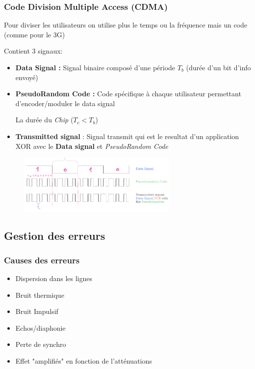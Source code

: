\documentclass[12pt]{article}
\begin{document}
		\subsubsection{Code Division Multiple Access (CDMA)}
		
			Pour diviser les utilisateurs  on utilise plus le temps ou la fréquence mais un code (comme pour le 3G)
			
			Contient 3 signaux:
			\begin{itemize}
				\item \textbf{Data Signal :} Signal binaire composé d'une période $T_b$ (durée d'un bit d'info envoyé)
				\item \textbf{PseudoRandom Code :} Code spécifique à chaque utilisateur permettant d'encoder/moduler le data signal
				
				La durée du \textit{Chip} ($T_c < T_b$)
				\item \textbf{Transmitted signal} : Signal transmit qui est le resultat d'un application XOR avec le \textbf{Data signal} et \textit{PseudoRandom Code}
			\end{itemize}
			
			\begin{figure}[htp]
				\centering
				\includegraphics[width=0.7\textwidth]{img/CDMA.png}
			\end{figure}
			
	\subsection{Gestion des erreurs}
		\subsubsection{Causes des erreurs}
			\begin{itemize}
				\item Dispersion dans les lignes
				\item Bruit thermique
				\item Bruit Impulsif
				\item Echos/diaphonie
				\item Perte de synchro
				\item Effet "amplifiés" en fonction de l'atténuations
			\end{itemize}
			
\end{document}
